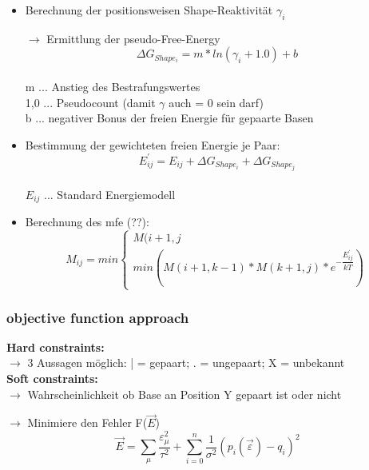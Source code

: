 \begin{itemize}
\item Berechnung der positionsweisen Shape-Reaktivität $\gamma_i$

\item[$\rightarrow$] Ermittlung der pseudo-Free-Energy \\
\begin{equation}
\Delta G_{Shape_i} = m * ln(\gamma_i + 1.0) + b
\end{equation} \\

m ... Anstieg des Bestrafungswertes \\
1,0 ... Pseudocount (damit $\gamma$ auch = 0 sein darf)\\
b ... negativer Bonus der freien Energie für gepaarte Basen \\

\item Bestimmung der gewichteten freien Energie je Paar: \\
\begin{equation}
E^{'}_{ij} = E_{ij} + \Delta G_{Shape_i} + \Delta G_{Shape_j}
\end{equation} \\
$E_{ij}$ ... Standard Energiemodell

\item Berechnung des mfe (??): \\
\begin{equation}
M_{ij} = min
\begin{cases} 
M(i+1,j \\
min (M(i+1,k-1)*M(k+1,j)*e^{-\dfrac{E^{'}_{ij}}{kT}})
\end{cases}
\end{equation}
\end{itemize}

\subsubsection{objective function approach}
\textbf{Hard constraints:} \\
$\rightarrow$ 3 Aussagen möglich: | = gepaart; . = ungepaart; X = unbekannt \\
\textbf{Soft constraints:} \\ 
$\rightarrow$ Wahrscheinlichkeit ob Base an Position Y gepaart ist oder nicht 

$\rightarrow$ Minimiere den Fehler F($\vec{E}$) \\
\begin{equation}
\vec{E} = \sum_{\mu} \dfrac{\varepsilon_{\mu}^{2}}{\tau^2} + \sum_{i = 0}^{n} \dfrac{1}{\sigma^2}(p_i(\vec{\varepsilon}) -q_i)^2
\end{equation} 

